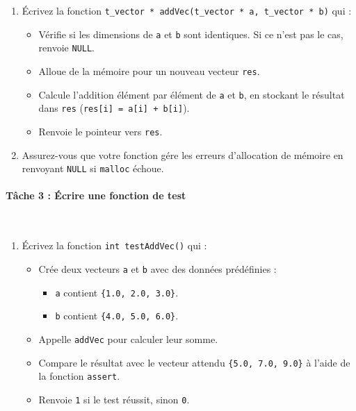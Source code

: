 \begin{wtodo}{}
\begin{enumerate}
    \item \'Ecrivez la fonction \texttt{t\_vector * addVec(t\_vector * a, t\_vector * b)} qui :
    \begin{itemize}
        \item V\'erifie si les dimensions de \texttt{a} et \texttt{b} sont identiques. Si ce n'est pas le cas, renvoie \texttt{NULL}.
        \item Alloue de la m\'emoire pour un nouveau vecteur \texttt{res}.
        \item Calcule l'addition \'el\'ement par \'el\'ement de \texttt{a} et \texttt{b}, en stockant le r\'esultat dans \texttt{res} (\texttt{res[i] = a[i] + b[i]}).
        \item Renvoie le pointeur vers \texttt{res}.
    \end{itemize}
    \item Assurez-vous que votre fonction g\'ere les erreurs d'allocation de m\'emoire en renvoyant \texttt{NULL} si \texttt{malloc} \'echoue.
\end{enumerate}

\paragraph{T\^ache 3 : \'Ecrire une fonction de test}\,

\begin{enumerate}
    \item \'Ecrivez la fonction \texttt{int testAddVec()} qui :
    \begin{itemize}
        \item Cr\'ee deux vecteurs \texttt{a} et \texttt{b} avec des donn\'ees pr\'ed\'efinies :
        \begin{itemize}
            \item \texttt{a} contient \texttt{\{1.0, 2.0, 3.0\}}.
            \item \texttt{b} contient \texttt{\{4.0, 5.0, 6.0\}}.
        \end{itemize}
        \item Appelle \texttt{addVec} pour calculer leur somme.
        \item Compare le r\'esultat avec le vecteur attendu \texttt{\{5.0, 7.0, 9.0\}} à l'aide de la fonction \texttt{assert}.
        \item Renvoie \texttt{1} si le test r\'eussit, sinon \texttt{0}.
    \end{itemize}
\end{enumerate}


\end{wtodo}
